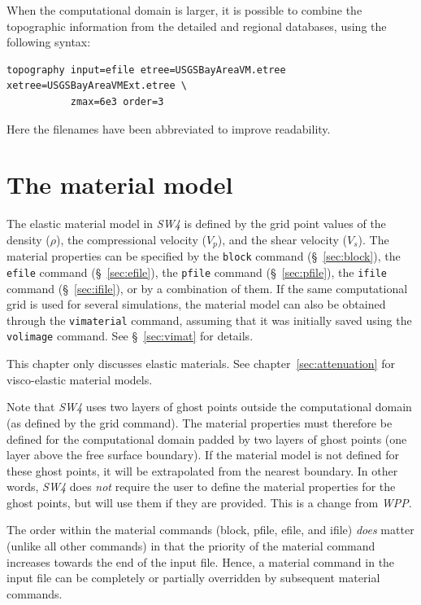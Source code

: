 \documentclass[11pt]{report}
\begin{document}
When the computational domain is larger, it is possible to combine the topographic information from
the detailed and regional databases, using the following syntax:
\begin{verbatim}
topography input=efile etree=USGSBayAreaVM.etree xetree=USGSBayAreaVMExt.etree \
           zmax=6e3 order=3
\end{verbatim}
Here the filenames have been abbreviated to improve readability.


\chapter{The material model} \label{sec:material}

The elastic material model in \emph{SW4} is defined by the grid point values of the density
($\rho$), the compressional velocity ($V_p$), and the shear velocity ($V_s$). The material
properties can be specified by the \verb+block+ command (\S~\ref{sec:block}), the \verb+efile+ command
(\S~\ref{sec:efile}), the \verb+pfile+ command (\S~\ref{sec:pfile}), the \verb+ifile+ command
(\S~\ref{sec:ifile}), or by a combination of them. If the same computational grid is used for
several simulations, the material model can also be obtained through the \verb+vimaterial+ command,
assuming that it was initially saved using the \verb+volimage+ command. See \S~\ref{sec:vimat} for
details.

This chapter only discusses elastic materials. See chapter~\ref{sec:attenuation} for visco-elastic
material models.


Note that \emph{SW4} uses two layers of ghost points outside the computational domain (as defined by
the grid command). The material properties must therefore be defined for the computational domain
padded by two layers of ghost points (one layer above the free surface boundary). If the material
model is not defined for these ghost points, it will be extrapolated from the nearest boundary. In
other words, \emph{SW4} does {\em not} require the user to define the material properties for the
ghost points, but will use them if they are provided. This is a change from \emph{WPP}.

The order within the material commands (block, pfile, efile, and ifile) {\em does} matter (unlike
all other commands) in that the priority of the material command increases towards the end of the
input file. Hence, a material command in the input file can be completely or partially overridden by
subsequent material commands.
\end{document}
